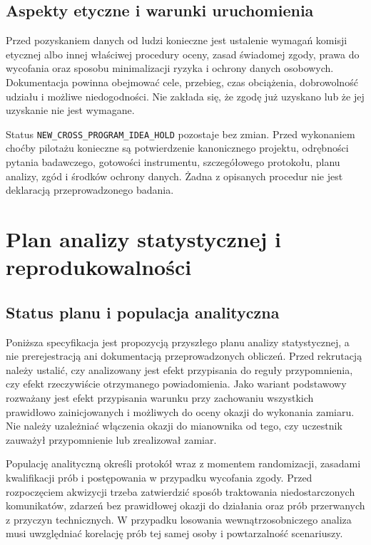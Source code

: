 \documentclass[11pt,a4paper]{article}
\begin{document}
\subsection{Aspekty etyczne i warunki uruchomienia}
Przed pozyskaniem danych od ludzi konieczne jest ustalenie wymagań komisji etycznej albo innej właściwej procedury oceny, zasad świadomej zgody, prawa do wycofania oraz sposobu minimalizacji ryzyka i ochrony danych osobowych. Dokumentacja powinna obejmować cele, przebieg, czas obciążenia, dobrowolność udziału i możliwe niedogodności. Nie zakłada się, że zgodę już uzyskano lub że jej uzyskanie nie jest wymagane.

Status \texttt{NEW\_CROSS\_PROGRAM\_IDEA\_HOLD} pozostaje bez zmian. Przed wykonaniem choćby pilotażu konieczne są potwierdzenie kanonicznego projektu, odrębności pytania badawczego, gotowości instrumentu, szczegółowego protokołu, planu analizy, zgód i środków ochrony danych. Żadna z opisanych procedur nie jest deklaracją przeprowadzonego badania.

\section{Plan analizy statystycznej i reprodukowalności}
\subsection{Status planu i populacja analityczna}
Poniższa specyfikacja jest propozycją przyszłego planu analizy statystycznej, a nie prerejestracją ani dokumentacją przeprowadzonych obliczeń. Przed rekrutacją należy ustalić, czy analizowany jest efekt przypisania do reguły przypomnienia, czy efekt rzeczywiście otrzymanego powiadomienia. Jako wariant podstawowy rozważany jest efekt przypisania warunku przy zachowaniu wszystkich prawidłowo zainicjowanych i możliwych do oceny okazji do wykonania zamiaru. Nie należy uzależniać włączenia okazji do mianownika od tego, czy uczestnik zauważył przypomnienie lub zrealizował zamiar.

Populację analityczną określi protokół wraz z momentem randomizacji, zasadami kwalifikacji prób i postępowania w przypadku wycofania zgody. Przed rozpoczęciem akwizycji trzeba zatwierdzić sposób traktowania niedostarczonych komunikatów, zdarzeń bez prawidłowej okazji do działania oraz prób przerwanych z przyczyn technicznych. W przypadku losowania wewnątrzosobniczego analiza musi uwzględniać korelację prób tej samej osoby i powtarzalność scenariuszy.
\end{document}
